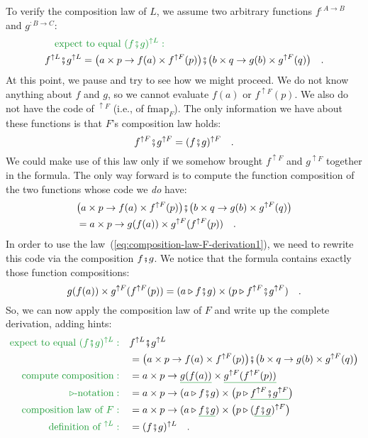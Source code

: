 To verify the composition law of $L$, we assume two arbitrary functions
$f^{:A\rightarrow B}$ and $g^{:B\rightarrow C}$:
\begin{align*}
 & \quad{\color{greenunder}\text{expect to equal }(f\bef g)^{\uparrow L}:}\quad\\
 & f^{\uparrow L}\bef g^{\uparrow L}=\big(a\times p\rightarrow f(a)\times f^{\uparrow F}(p)\big)\bef\big(b\times q\rightarrow g(b)\times g^{\uparrow F}(q)\big)\quad.
\end{align*}
At this point, we pause and try to see how we might proceed. We do
not know anything about $f$ and $g$, so we cannot evaluate $f(a)$
or $f^{\uparrow F}(p)$. We also do not have the code of $^{\uparrow F}$
(i.e., of $\text{fmap}_{F}$). The only information we have about
these functions is that $F$\textsf{'}s composition law holds:
\begin{equation}
f^{\uparrow F}\bef g^{\uparrow F}=(f\bef g)^{\uparrow F}\quad.\label{eq:composition-law-F-derivation1}
\end{equation}
We could make use of this law only if we somehow brought $f^{\uparrow F}$
and $g^{\uparrow F}$ together in the formula. The only way forward
is to compute the function composition of the two functions whose
code we \emph{do} have:
\begin{align*}
 & \big(a\times p\rightarrow f(a)\times f^{\uparrow F}(p)\big)\bef\big(b\times q\rightarrow g(b)\times g^{\uparrow F}(q)\big)\\
 & =a\times p\rightarrow g(f(a))\times g^{\uparrow F}(f^{\uparrow F}(p))\quad.
\end{align*}
In order to use the law~(\ref{eq:composition-law-F-derivation1}),
we need to rewrite this code via the composition $f\bef g$. We notice
that the formula contains exactly those function compositions:
\[
g(f(a))\times g^{\uparrow F}(f^{\uparrow F}(p))=(a\triangleright f\bef g)\times(p\triangleright f^{\uparrow F}\bef g^{\uparrow F})\quad.
\]
So, we can now apply the composition law of $F$ and write up the
complete derivation, adding hints:
\begin{align*}
{\color{greenunder}\text{expect to equal }(f\bef g)^{\uparrow L}:}\quad & f^{\uparrow L}\bef g^{\uparrow L}\\
 & =\big(a\times p\rightarrow f(a)\times f^{\uparrow F}(p)\big)\bef\big(b\times q\rightarrow g(b)\times g^{\uparrow F}(q)\big)\\
{\color{greenunder}\text{compute composition}:}\quad & =a\times p\rightarrow\gunderline{g(f(a))}\times\gunderline{g^{\uparrow F}(f^{\uparrow F}(p))}\\
{\color{greenunder}\triangleright\text{-notation}:}\quad & =a\times p\rightarrow(a\triangleright f\bef g)\times\big(p\triangleright\gunderline{f^{\uparrow F}\bef g^{\uparrow F}}\big)\\
{\color{greenunder}\text{composition law of }F:}\quad & =a\times p\rightarrow(a\triangleright\gunderline{f\bef g})\times\big(p\triangleright(\gunderline{f\bef g})^{\uparrow F}\big)\\
{\color{greenunder}\text{definition of }^{\uparrow L}:}\quad & =(f\bef g)^{\uparrow L}\quad.
\end{align*}

